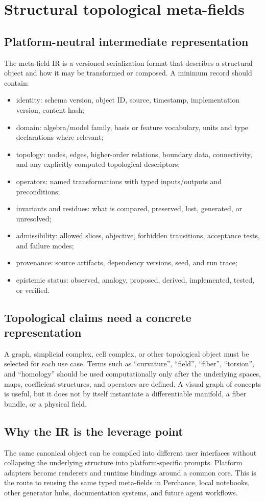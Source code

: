 \documentclass[11pt,oneside]{article}
\begin{document}
\section{Structural topological meta-fields}
\subsection{Platform-neutral intermediate representation}
The meta-field IR is a versioned serialization format that describes a structural object and how it may be transformed or composed. A minimum record should contain:
\begin{itemize}
  \item identity: schema version, object ID, source, timestamp, implementation version, content hash;
  \item domain: algebra/model family, basis or feature vocabulary, units and type declarations where relevant;
  \item topology: nodes, edges, higher-order relations, boundary data, connectivity, and any explicitly computed topological descriptors;
  \item operators: named transformations with typed inputs/outputs and preconditions;
  \item invariants and residues: what is compared, preserved, lost, generated, or unresolved;
  \item admissibility: allowed slices, objective, forbidden transitions, acceptance tests, and failure modes;
  \item provenance: source artifacts, dependency versions, seed, and run trace;
  \item epistemic status: observed, analogy, proposed, derived, implemented, tested, or verified.
\end{itemize}

\subsection{Topological claims need a concrete representation}
A graph, simplicial complex, cell complex, or other topological object must be selected for each use case. Terms such as ``curvature'', ``field'', ``fiber'', ``torsion'', and ``homology'' should be used computationally only after the underlying spaces, maps, coefficient structures, and operators are defined. A visual graph of concepts is useful, but it does not by itself instantiate a differentiable manifold, a fiber bundle, or a physical field.

\subsection{Why the IR is the leverage point}
The same canonical object can be compiled into different user interfaces without collapsing the underlying structure into platform-specific prompts. Platform adapters become renderers and runtime bindings around a common core. This is the route to reusing the same typed meta-fields in Perchance, local notebooks, other generator hubs, documentation systems, and future agent workflows.
\end{document}
